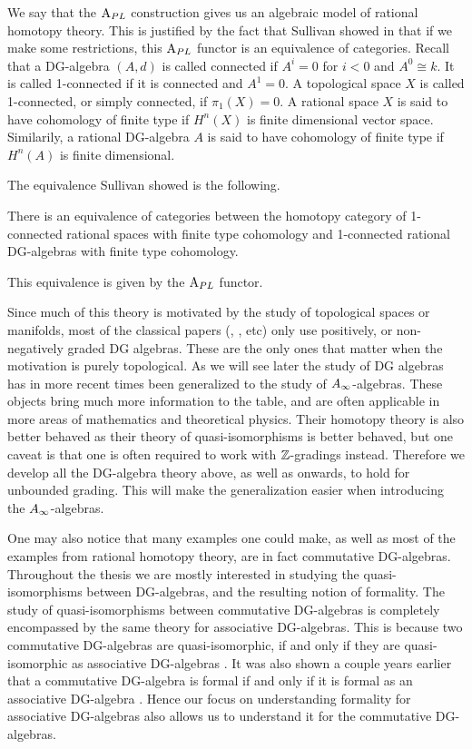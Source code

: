 We say that the $\text{A}_{PL}$ construction gives us an algebraic model of rational homotopy theory. This is justified by the fact that Sullivan showed in \cite{Sullivan} that if we make some restrictions, this $\text{A}_{PL}$ functor is an equivalence of categories. Recall that a DG-algebra $(A, d)$ is called connected if $A^i = 0$ for $i< 0$ and $A^0\cong k$. It is called 1-connected if it is connected and $A^1=0$. A topological space $X$ is called 1-connected, or simply connected, if $\pi_1(X)=0$. A rational space $X$ is said to have cohomology of finite type if $H^n(X)$ is finite dimensional vector space. Similarily, a rational DG-algebra $A$ is said to have cohomology of finite type if $H^n(A)$ is finite dimensional. 

The equivalence Sullivan showed is the following.

\begin{theorem}
There is an equivalence of categories between the homotopy category of 1-connected rational spaces with finite type cohomology and 1-connected rational DG-algebras with finite type cohomology. 

This equivalence is given by the $\text{A}_{PL}$ functor. 
\end{theorem}

Since much of this theory is motivated by the study of topological spaces or manifolds, most of the classical papers (\cite{DGMS}, \cite{Sullivan}, \cite{PLdeRham} etc) only use positively, or non-negatively graded DG algebras. These are the only ones that matter when the motivation is purely topological. As we will see later the study of DG algebras has in more recent times been generalized to the study of $A_{\infty}$-algebras. These objects bring much more information to the table, and are often applicable in more areas of mathematics and theoretical physics. Their homotopy theory is also better behaved as their theory of quasi-isomorphisms is better behaved, but one caveat is that one is often required to work with $\mathbb{Z}$-gradings instead. Therefore we develop all the DG-algebra theory above, as well as onwards, to hold for unbounded grading. This will make the generalization easier when introducing the $A_{\infty}$-algebras. 

One may also notice that many examples one could make, as well as most of the examples from rational homotopy theory, are in fact commutative DG-algebras. Throughout the thesis we are mostly interested in studying the quasi-isomorphisms between DG-algebras, and the resulting notion of formality. The study of quasi-isomorphisms between commutative DG-algebras is completely encompassed by the same theory for associative DG-algebras. This is because two commutative DG-algebras are quasi-isomorphic, if and only if they are quasi-isomorphic as associative DG-algebras \cite{Petersen}. It was also shown a couple years earlier that a commutative DG-algebra is formal if and only if it is formal as an associative DG-algebra \cite{Saleh}. Hence our focus on understanding formality for associative DG-algebras also allows us to understand it for the commutative DG-algebras. 


